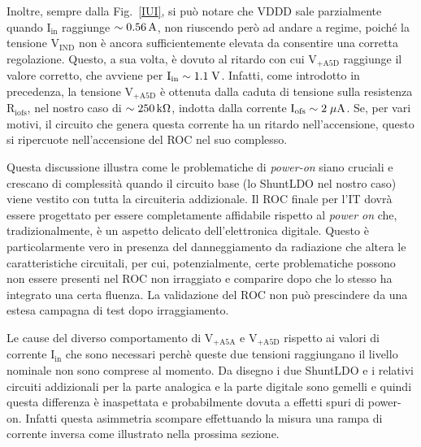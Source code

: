 Inoltre, sempre dalla Fig.~\ref{IUI}, si può notare che VDDD sale parzialmente quando $\mathrm{I_{in}}$ raggiunge $\sim0.56\rm \, A$, non riuscendo però ad andare a regime, poiché la tensione $\mathrm{V_{IND}}$ non è ancora sufficientemente elevata da consentire una corretta regolazione. Questo, a sua volta, è dovuto al ritardo con cui $\mathrm{V_{+A5D}}$ raggiunge il valore corretto, che avviene per $\mathrm{I_{in}\sim 1.1\rm \; V}$. Infatti, come introdotto in precedenza, la tensione  $\mathrm{V_{+A5D}}$ è ottenuta dalla caduta di tensione sulla resistenza $\mathrm{R_{iofs}}$, nel nostro caso di $\sim 250{\rm \, k\Omega}$, indotta dalla corrente $\mathrm{I_{ofs} \sim 2 \; \mu \rm A}$. Se, per vari motivi, il circuito che genera questa corrente ha un ritardo nell'accensione, questo si ripercuote nell'accensione del ROC nel suo complesso.  

Questa discussione illustra come le problematiche di {\em power-on} siano cruciali e crescano di complessit\`a quando il circuito base (lo ShuntLDO nel nostro caso) viene vestito con tutta la circuiteria addizionale. Il ROC finale per l'IT dovr\`a essere progettato per essere completamente affidabile rispetto al {\em power on} che, tradizionalmente, \`e un aspetto delicato dell'elettronica digitale. Questo \`e particolarmente vero in presenza del danneggiamento da radiazione che altera le caratteristiche circuitali, per cui, potenzialmente, certe problematiche possono non essere presenti nel ROC non irraggiato e comparire dopo che lo stesso ha integrato una certa fluenza. La validazione del ROC non pu\`o prescindere da una estesa campagna di test dopo irraggiamento.

Le cause del diverso comportamento di $\mathrm{V_{+A5A}}$ e $\mathrm{V_{+A5D}}$ rispetto ai valori di corrente $\mathrm{I_{in}}$ che sono necessari perch\`e queste due tensioni raggiungano il livello nominale non sono comprese al momento. Da disegno i due ShuntLDO e i relativi circuiti addizionali per la parte analogica e la parte digitale sono gemelli e quindi questa differenza \`e inaspettata e probabilmente dovuta a effetti spuri di power-on. Infatti questa asimmetria scompare effettuando la misura una rampa di corrente inversa come illustrato nella prossima sezione.

% 
%
%

